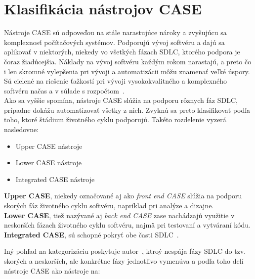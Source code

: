 \documentclass[10pt,twoside,slovak,a4paper]{article}
\newenvironment{multiitem}{%
  \multienumerate\renewcommand{\labelname}{\textbullet}%
}{%
  \endmultienumerate%
}
\begin{document}
\section{Klasifikácia nástrojov CASE}\label{klasifikácia}

Nástroje CASE sú odpoveďou na stále narastujúce nároky a zvyšujúcu sa komplexnosť počítačových systémov. Podporujú vývoj softvéru a dajú sa aplikovať v niektorých, niekedy vo všetkých fázach SDLC, ktorého podpora je čoraz žiadúcejšia. Náklady na vývoj softvéru každým rokom narastajú, a preto čo i len skromné vylepšenia pri vývoji a automatizácii môžu znamenať veľké úspory.  Sú cielené na riešenie ťažkostí pri vývoji vysokokvalitného a komplexného softvéru načas a v súlade s rozpočtom~\cite{2001}. \\

Ako sa vyššie spomína, nástroje CASE slúžia na podporu rôznych fáz SDLC, prípadne dokážu automatizovať všetky z nich. Zvyknú sa preto klasifikovať podľa toho, ktoré štádium životného cyklu podporujú. Takéto rozdelenie vyzerá nasledovne:

\begin{itemize}
\item Upper CASE nástroje
\item Lower CASE nástroje
\item Integrated CASE nástroje
\end{itemize}
\textbf{Upper CASE}, niekedy označované aj ako \emph{front end CASE} slúžia na podporu skorých fáz životného cyklu softvéru, napríklad pri analýze a dizajne.\\
\textbf{Lower CASE}, tiež nazývané aj \emph{back end CASE} zase nachádzajú využitie v neskorších fázach životného cyklu softvéru, najmä pri testovaní a vytváraní kódu.\\
\textbf{Integrated CASE}, sú schopné pokryť obe časti SDLC~\cite{1998}.


Iný pohľad na kategorizáciu poskytuje autor~\cite{2017}, ktroý nespája fázy SDLC do tzv. skorých a neskorších, ale konkrétne fázy jednotlivo vymenúva a podľa toho delí nástroje CASE ako nástroje na:
\begin{multiitem}
\end{multiitem}
\end{document}
